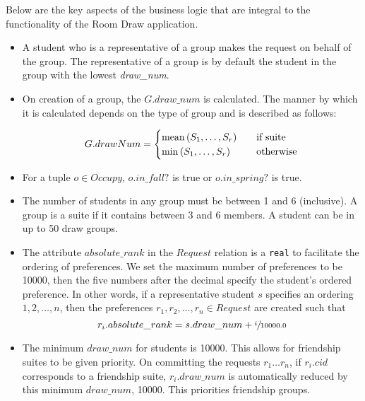 \noindent Below are the key aspects of the business logic that are integral to
the functionality of the Room Draw application.

\begin{itemize}
\item A student who is a representative of a group makes the request on behalf
of the group. The representative of a group is by default the student in the
group with the lowest \emph{draw\_num}.

\item On creation of a group, the \(G.draw\_num\) is calculated. The manner by
which it is calculated depends on the type of group and is described as follows:

\[
    G.drawNum =
        \begin{cases}
        \text{mean} \del{S_1, \ldots, S_r} & \quad \mbox{if suite} \\
        \min \del{S_1, \ldots, S_r} & \quad \mbox{otherwise}
        \end{cases}
\]

\item For a tuple \(o \in Occupy\), \(o.in\_fall?\) is true or \(o.in\_spring?\) is true.

\item The number of students in any group must be between 1 and 6 (inclusive).
A group is a suite if it contains between 3 and 6 members. A student can be in up to 50
draw groups.

\item The attribute \(absolute\_rank\) in the \(Request\) relation is a \texttt{real} to
facilitate the ordering of preferences.  We set the maximum number of preferences to
be \num{10000}, then the five numbers after the decimal specify the student's ordered
preference. In other words, if a representative student \(s\) specifies an
ordering \(1,2,\ldots, n\), then the preferences \(r_1,r_2, \ldots, r_n \in
Request\) are created such that \[r_i.absolute\_rank = s.draw\_num + \sfrac{i}{10000.0}\]

\item The minimum \(draw\_num\) for students is \num{10000}. This allows for
friendship suites to be given priority. On committing the requests \(r_1\ldots
r_n\), if \(r_i.cid\) corresponds to a friendship suite, \(r_i.draw\_num\) is
automatically reduced by this minimum \(draw\_num\), \num{10000}. 
This priorities friendship groups.
\end{itemize}

